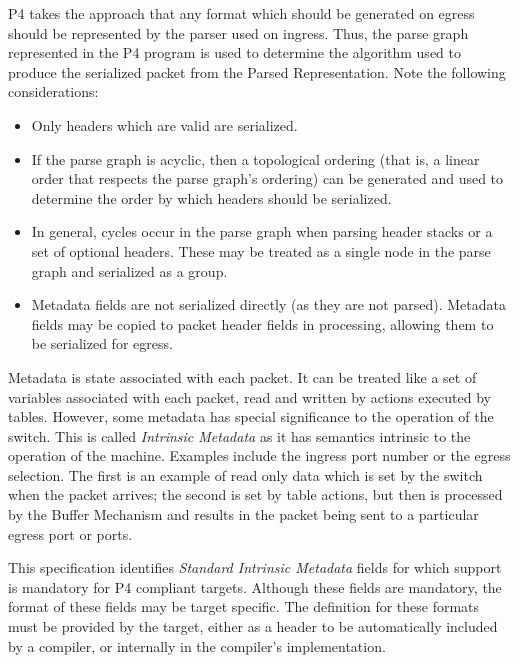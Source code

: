 \documentclass[12pt]{article}
\begin{document}
P4 takes the approach that any format which should be generated on egress 
should be represented by the parser used on ingress.  Thus, the parse graph 
represented in the P4 program is used to determine the algorithm used to produce 
the serialized packet from the Parsed Representation.  Note the following 
considerations:

\begin{itemize}
\item
Only headers which are valid are serialized.
\item
If the parse graph is acyclic, then a topological ordering (that is, a linear 
order that respects the parse graph's ordering) can be generated and used 
to determine the order by which headers should be serialized.
\item
In general, cycles occur in the parse graph when parsing header stacks or 
a set of optional headers.  These may be treated as a single node in the parse 
graph and serialized as a group. 
\item
Metadata fields are not serialized directly (as they are not parsed).  Metadata 
fields may be copied to packet header fields in \matchaction processing, allowing 
them to be serialized for egress.
\end{itemize}



Metadata is state associated with each packet. It can be treated like a set 
of variables associated with each packet, read and written by actions executed 
by tables. However, some metadata has special significance to the operation 
of the switch. This is called \textit{Intrinsic Metadata} as it has semantics intrinsic 
to the operation of the machine. Examples include the ingress port number 
or the egress selection. The first is an example of read only data which is 
set by the switch when the packet arrives; the second is set by table actions, 
but then is processed by the Buffer Mechanism and results in the packet being 
sent to a particular egress port or ports.

This specification identifies \textit{Standard Intrinsic Metadata} fields for which 
support is man\-datory for P4 compliant targets. Although these fields are mandatory, 
the format of these fields may be target specific. The definition for these 
formats must be provided by the target, either as a header to be automatically 
included by a compiler, or internally in the compiler's implementation.
\end{document}
